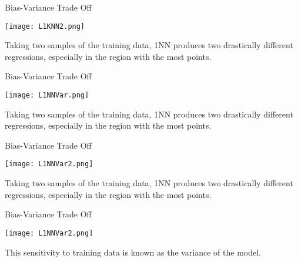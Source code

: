 \documentclass[10pt,handout]{beamer}
\begin{document}
\begin{frame}[fragile]{Bias-Variance Trade Off}
  \begin{minipage}[t][0.5\textheight][t]{\textwidth}
    \centering
     \texttt{[image: L1KNN2.png]}
  \end{minipage}
  \vfill
  \begin{minipage}[t][0.5\textheight][t]{\textwidth}
Taking two samples of the training data, 1NN produces two drastically different regressions, especially in the region with the most points.
 \end{minipage}
\end{frame}


\begin{frame}[fragile]{Bias-Variance Trade Off}
  \begin{minipage}[t][0.5\textheight][t]{\textwidth}
    \centering
     \texttt{[image: L1NNVar.png]}
  \end{minipage}
  \vfill
  \begin{minipage}[t][0.5\textheight][t]{\textwidth}
Taking two samples of the training data, 1NN produces two drastically different regressions, especially in the region with the most points.
 \end{minipage}
\end{frame}




\begin{frame}[fragile]{Bias-Variance Trade Off}
  \begin{minipage}[t][0.5\textheight][t]{\textwidth}
    \centering
     \texttt{[image: L1NNVar2.png]}
  \end{minipage}
  \vfill
  \begin{minipage}[t][0.5\textheight][t]{\textwidth}
Taking two samples of the training data, 1NN produces two drastically different regressions, especially in the region with the most points.
 \end{minipage}
\end{frame}



\begin{frame}[fragile]{Bias-Variance Trade Off}
  \begin{minipage}[t][0.5\textheight][t]{\textwidth}
    \centering
     \texttt{[image: L1NNVar2.png]}
  \end{minipage}
  \vfill
  \begin{minipage}[t][0.5\textheight][t]{\textwidth}
This sensitivity to training data is known as the variance of the model.
 \end{minipage}
\end{frame}
\end{document}
